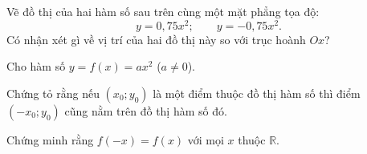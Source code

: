 \begin{practice}
\begin{questions}[series=SBT]
        \item Vẽ đồ thị của hai hàm số sau trên cùng một mặt phẳng tọa độ:
        \[
            y=0{,}75x^2;\qquad y=-0{,}75x^2.
        \]
        Có nhận xét gì về vị trí của hai đồ thị này so với trục hoành $Ox$?
        \answerline
        \answerline
        \answerline

        \item Cho hàm số $y=f(x)=ax^2$ ($a\ne0$).
        \begin{questions}
            \item Chứng tỏ rằng nếu $(x_0;y_0)$ là một điểm thuộc đồ thị hàm số thì điểm $(-x_0;y_0)$ cũng nằm trên đồ thị hàm số đó.
            \item Chứng minh rằng $f(-x)=f(x)$ với mọi $x$ thuộc $\mathbb{R}$.
        \end{questions}
        \answerline
        \answerline
        \answerline
    \end{questions}
\end{practice}
